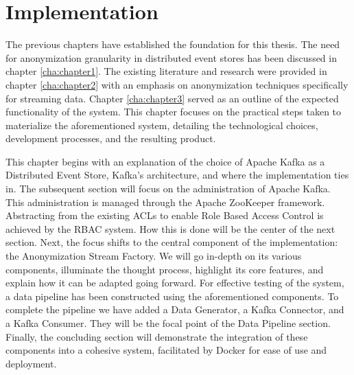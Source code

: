 \chapter{Implementation\label{cha:chapter4}}
The previous chapters have established the foundation for this thesis. The need for anonymization granularity in distributed event stores has been discussed in chapter \ref{cha:chapter1}. The existing literature and research were provided in chapter \ref{cha:chapter2} with an emphasis on anonymization techniques specifically for streaming data. Chapter \ref{cha:chapter3} served as an outline of the expected functionality of the system. This chapter focuses on the practical steps taken to materialize the aforementioned system, detailing the technological choices, development processes, and the resulting product.\par

This chapter begins with an explanation of the choice of Apache Kafka as a Distributed Event Store, Kafka's architecture, and where the implementation ties in. The subsequent section will focus on the administration of Apache Kafka. This administration is managed through the Apache ZooKeeper framework. Abstracting from the existing \acp{ACL} to enable Role Based Access Control is achieved by the \ac{RBAC} system. How this is done will be the center of the next section. Next, the focus shifts to the central component of the implementation: the Anonymization Stream Factory. We will go in-depth on its various components, illuminate the thought process, highlight its core features, and explain how it can be adapted going forward. For effective testing of the system, a data pipeline has been constructed using the aforementioned components. To complete the pipeline we have added a Data Generator, a Kafka Connector, and a Kafka Consumer. They will be the focal point of the Data Pipeline section. Finally, the concluding section will demonstrate the integration of these components into a cohesive system, facilitated by Docker for ease of use and deployment.

